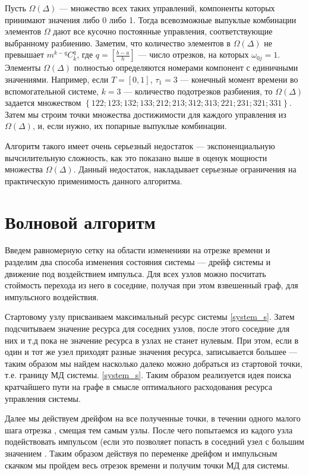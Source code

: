 Пусть $\Omega(\Delta)$ --- множество всех таких управлений, компоненты
которых принимают значения либо 0 либо 1. Тогда всевозможные выпуклые
комбинации элементов $\Omega$ дают все кусочно постоянные управления,
соответствующие выбранному разбиению.  Заметим, что количество
элементов в $\Omega(\Delta)$ не превышает $m^{k-q} C_k^q$, где
$q=\left[\frac{b-a}{h}\right]$ --- число отрезков, на которых
$\omega_{0j}=1$.  Элементы $\Omega(\Delta)$ полностью определяются
номерами компонент с единичными значениями. Например, если $T=[0,1]$,
$\tau_1=3$ --- конечный момент времени во вспомогательной системе,
$k=3$ --- количество подотрезков разбиения, то $\Omega(\Delta)$
задается множеством
$\left\{122; 123 ; 132 ; 133 ;212 ; 213; 312 ; 313 ; 221; 231 ; 321 ;
  331 \right\}$.
Затем мы строим точки множества достижимости для каждого управления из
$\Omega(\Delta)$, и, если нужно, их попарные выпуклые комбинации.

Алгоритм такого имеет очень серьезный недостаток --- экспоненциальную
вычсилительную сложность, как это показано выше в оценук мощности
множества $\Omega(\Delta)$. Данный недостаток, накладывает серьезные
ограничения на практическую применимость данного алгоритма.

\section{Волновой алгоритм}
\label{sec:wave_alg}
Введем равномерную сетку на области измененияи на отрезке времени и
разделим два способа изменения состояния системы — дрейф системы и
движение под воздействием импульса.  Для всех узлов можно посчитать
стоймость перехода из него в соседние, получая при этом взвешенный
граф, для импульсного воздействия.

Стартовому узлу присваиваем максимальный ресурс системы \eqref{system_s}. Затем
подсчитываем значение ресурса для соседних узлов, после этого соседние
для них и т.д пока не значение ресурса в узлах не станет нулевым. При
этом, если в один и тот же узел приходят разные значения ресурса,
записывается большее — таким образом мы найдем насколько далеко можно
добраться из стартовой точки, т.е. границу МД системы. \eqref{system_s}. Таким
образом реализуется идея поиска кратчайшего пути на графе в смысле
оптимального расходования ресурса управления системы.

Далее мы действуем дрейфом на все полученные точки, в течении одного
малого шага отрезка , смещая тем самым узлы. После чего попытаемся из
кадого узла подействовать импульсом (если это позволяет попасть в
соседний узел с большим значением .  Таким образом действуя по
переменке дрейфом и импульсным скачком мы пройдем весь отрезок времени
и получим точки МД для системы.
